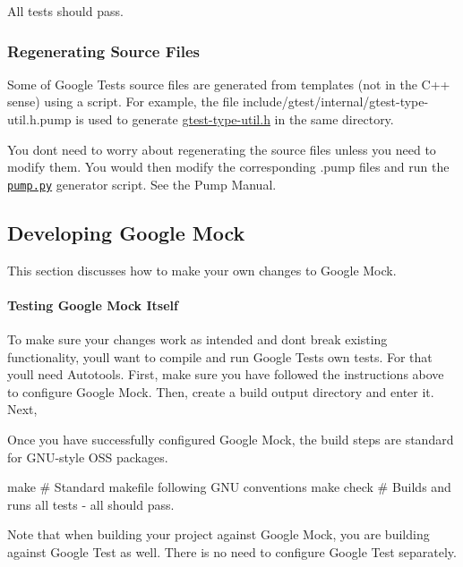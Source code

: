 All tests should pass.

\subsubsection*{Regenerating Source Files}

Some of Google Test\textquotesingle{}s source files are generated from templates (not in the C++ sense) using a script. For example, the file include/gtest/internal/gtest-\/type-\/util.\+h.\+pump is used to generate \mbox{\hyperlink{gtest-type-util_8h_source}{gtest-\/type-\/util.\+h}} in the same directory.

You don\textquotesingle{}t need to worry about regenerating the source files unless you need to modify them. You would then modify the corresponding {\ttfamily .pump} files and run the \textquotesingle{}\href{googletest/scripts/pump.py}{\tt pump.\+py}\textquotesingle{} generator script. See the Pump Manual.

\subsection*{Developing Google Mock}

This section discusses how to make your own changes to Google Mock.

\paragraph*{Testing Google Mock Itself}

To make sure your changes work as intended and don\textquotesingle{}t break existing functionality, you\textquotesingle{}ll want to compile and run Google Test\textquotesingle{}s own tests. For that you\textquotesingle{}ll need Autotools. First, make sure you have followed the instructions above to configure Google Mock. Then, create a build output directory and enter it. Next, 


Once you have successfully configured Google Mock, the build steps are standard for G\+NU-\/style O\+SS packages. \begin{DoxyVerb}make        # Standard makefile following GNU conventions
make check  # Builds and runs all tests - all should pass.
\end{DoxyVerb}


Note that when building your project against Google Mock, you are building against Google Test as well. There is no need to configure Google Test separately. 